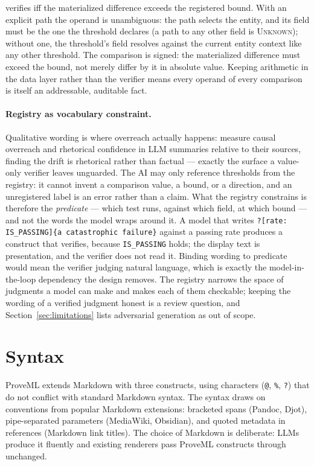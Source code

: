 \documentclass[11pt,a4paper]{article}
\begin{document}
\noindent verifies iff the materialized difference exceeds the registered bound. With an explicit path the operand is unambiguous: the path selects the entity, and its field must be the one the threshold declares (a path to any other field is \textsc{Unknown}); without one, the threshold's field resolves against the current entity context like any other threshold. The comparison is signed: the materialized difference must exceed the bound, not merely differ by it in absolute value. Keeping arithmetic in the data layer rather than the verifier means every operand of every comparison is itself an addressable, auditable fact.

\paragraph{Registry as vocabulary constraint.} Qualitative wording is where overreach actually happens: \citet{narrativelicense} measure causal overreach and rhetorical confidence in LLM summaries relative to their sources, finding the drift is rhetorical rather than factual --- exactly the surface a value-only verifier leaves unguarded. The AI may only reference thresholds from the registry: it cannot invent a comparison value, a bound, or a direction, and an unregistered label is an error rather than a claim. What the registry constrains is therefore the \textit{predicate} --- which test runs, against which field, at which bound --- and not the words the model wraps around it. A model that writes \verb|?[rate: IS_PASSING]{a catastrophic failure}| against a passing rate produces a construct that verifies, because \texttt{IS\_PASSING} holds; the display text is presentation, and the verifier does not read it. Binding wording to predicate would mean the verifier judging natural language, which is exactly the model-in-the-loop dependency the design removes. The registry narrows the space of judgments a model can make and makes each of them checkable; keeping the wording of a verified judgment honest is a review question, and Section~\ref{sec:limitations} lists adversarial generation as out of scope.

\section{Syntax}
\label{sec:syntax}

ProveML extends Markdown with three constructs, using characters (\texttt{@}, \texttt{\%}, \texttt{?}) that do not conflict with standard Markdown syntax. The syntax draws on conventions from popular Markdown extensions: bracketed spans (Pandoc, Djot), pipe-separated parameters (MediaWiki, Obsidian), and quoted metadata in references (Markdown link titles). The choice of Markdown is deliberate: LLMs produce it fluently and existing renderers pass ProveML constructs through unchanged.
\end{document}
